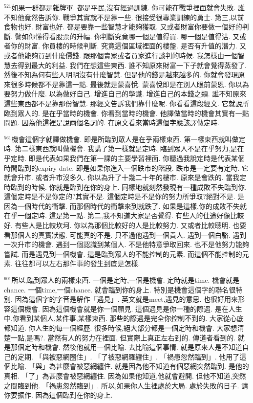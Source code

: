 \documentclass{book}
\begin{document}
$^{521}$如果一群都是雜牌軍.
都是平民,沒有經過訓練.
你可能在戰爭裡面就會失敗.
誰不知他竟然告訴你.
戰爭其實就不是靠一些.
很接受很專業訓練的勇士.
第三,以前食物也好.
財富也好.
都是要靠一些智慧才能夠獲取.
又或者財富你要做一個好的判斷.
譬如你懂得看股票的升幅.
你判斷究竟哪一個是值得買.
哪一個是值得沽.
又或者你的財富.
你買樓的時候判斷.
究竟這個區域裡面的樓盤.
是否有升值的潛力.
又或者他能夠買到什麼價錢.
跟那個賣家或者買家進行談判的時候.
我怎樣由一個智慧去得到最大的利益.
我們在想這些東西.
誰不知原來財富一下子就會覺得蒸發了.
然後不知為何有些人明明沒有什麼智慧.
但是他的錢是越來越多的.
你就會發現原來很多時候都不是靠這一點.
最後就是蒙喜悅.
蒙喜悅即是在別人眼前蒙恩.
你以為要努力做什麼.
以為做好自己.
增進自己的學識.
增進自己的本錢之類.
誰不知原來這些東西都不是靠那份智慧.
那經文告訴我們靠什麼呢.
你看看這段經文.
它就說所臨到眾人的.
是在乎當時的機會.
你看到當時的機會.
他譯做當時的機會其實有一點問題.
因為他這裡是說兩個名詞的.
在原文看來當時這個字應該譯做定時.

$^{561}$機會這個字就譯做機會.
即是所臨到眾人是在乎兩樣東西.
第一樣東西就叫做定時.
第二樣東西就叫做機會.
我講了第一樣就是定時.
臨到眾人不是在乎努力,是在乎定時.
即是代表如果我們在第一課的主要學習裡面.
你聽過我說定時是代表某個時間臨到的expiry date.
即是如果你進入一個跌市的階段.
跌市是一定要有定時.
它就會升市.
或者升市沒多久.
你以為升了十幾二十年的樓市.
原來是會跌的.
當我定時臨到的時候.
你就是臨到在你的身上.
同樣地就刻然發現有一種成敗不失臨到你.
這個定時是不是你定的?其實不是.
這個定時是不是你的努力所爭取?絕對不是.
是因為一個時代的衝擊.
而那個時代的衝擊來到就跌了.
如果是這樣,你的成敗不失就在乎一個定時.
這是第一點.
第二,我不知道大家是否覺得.
有些人的仕途好像比較好.
有些人是比較坎坷.
你以為那個比較好的人是比較努力.
又或者比較聰明.
也要看那個人的真實狀態.
可能真的不是.
只不過他遇到一個貴人.
遇到一個白駱.
遇到一次升市的機會.
遇到一個認識到某個人.
不是他特意爭取回來.
也不是他努力能夠嘗試.
而是遇見到一個機會.
這是臨到眾人的不能控制的元素.
而這個不能控制的元素.
往往都可以左右那件事的發生到底是怎樣.

$^{601}$所以,臨到眾人的兩樣東西.
一個是定時,一個是機會.
定時就是time.
機會就是chance.
一個time,一個chance.
就會臨到你的身上.
特別是機會這個字的聯名很特別.
因為這個字的字音是解作「遇見」.
英文就是meet,遇見的意思.
也很好用來形容這個機會.
因為這個機會就是你一個願見.
這個遇見是你一種的際遇.
是在人生中,你看到某個人,某件事,某樣東西.
那些的際遇是完全你控制不到的.
大家從心底都知道.
你人生的每一個經歷.
很多時候,絕大部分都是一個定時和機會.
大家想清楚一點,是嗎?.
當然有人的努力在裡面.
但實際上真正左右到的.
傳道者看到的.
就是那個定時和機會.
然後他就用一個比喻.
去比喻這個事情.
就是原來人是不知道自己的定期.
「與被惡網圈住」.
「了被惡網羅纏住」.
「禍患忽然臨到」.
他用了這個比喻.
「與」為甚麼會被惡網纏住.
就是因為他不知道有個惡網突然臨到.
是他的真相.
「了」為甚麼會被惡網纏住.
因為如果他知道,他就會避開.
但他不知道,突然之間臨到他.
「禍患忽然臨到」.
所以,如果你人生裡處於大局.
處於失敗的日子.
請你要振作.
因為這個臨到在你的身上.
\end{document}
